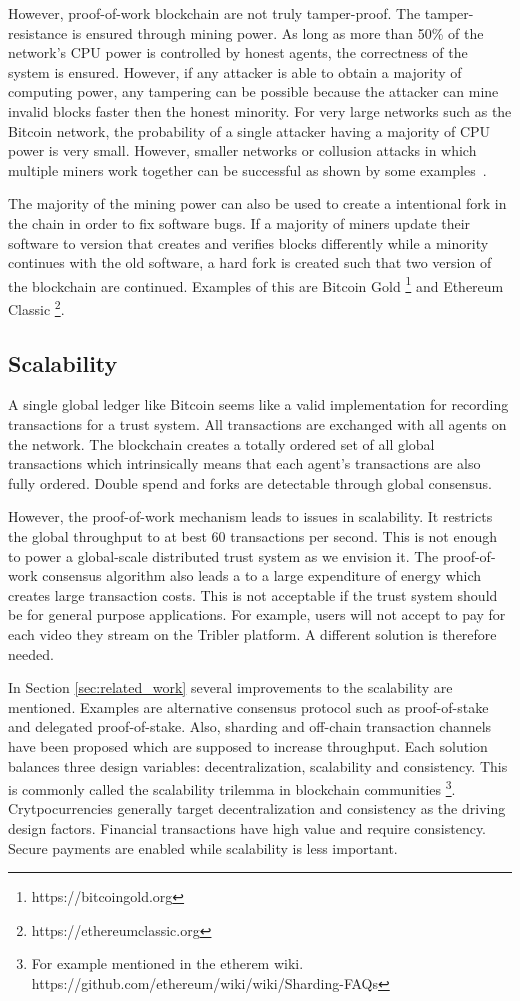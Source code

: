 However, proof-of-work blockchain are not truly tamper-proof. The tamper-resistance is ensured through
mining power. As long as more than 50\% of the network's CPU power is controlled by honest agents, 
the correctness of the system is ensured. However, if any attacker is able to obtain a majority of
computing power, any tampering can be possible because the attacker can mine invalid blocks faster
then the honest minority. For very large networks such as the Bitcoin network, the probability of 
a single attacker having a majority of CPU power is very small. However, smaller networks or collusion
attacks in which multiple miners work together can be successful as shown by some examples~\cite{51percentbitcoingold, 51percentverge}.

The majority of the mining power can also be used to create a intentional fork in the chain in order 
to fix software bugs. If a majority of miners update their software to version that creates and verifies blocks
differently while a minority continues with the old software, a hard fork is created such that two
version of the blockchain are continued. Examples of this are Bitcoin Gold \footnote{https://bitcoingold.org} and Ethereum Classic \footnote{https://ethereumclassic.org}.

\subsection{Scalability}
A single global ledger like Bitcoin seems like a valid implementation for recording transactions for a
trust system. All transactions are exchanged with all agents on the network. The blockchain 
creates a totally ordered set of all global transactions which intrinsically means that each agent's 
transactions are also fully ordered. Double spend and forks are detectable through global consensus. 

However, the proof-of-work mechanism leads to issues in scalability. It restricts the global throughput
to at best 60 transactions per second. This is not enough to power a global-scale distributed trust 
system as we envision it. The proof-of-work consensus algorithm also leads a to a large expenditure of energy which creates 
large transaction costs. This is not acceptable if the trust system should be for general purpose 
applications. For example, users will not accept to pay for each video they stream on the Tribler 
platform. A different solution is therefore needed.

In Section \ref{sec:related_work} several improvements to the scalability are mentioned. Examples are
alternative consensus protocol such as proof-of-stake and delegated proof-of-stake. Also, sharding
and off-chain transaction channels have been proposed which are supposed to increase throughput.
Each solution balances three design variables: decentralization, scalability and consistency. This
is commonly called the scalability trilemma in blockchain communities \footnote{For example mentioned in the etherem wiki. https://github.com/ethereum/wiki/wiki/Sharding-FAQs}.
Crytpocurrencies generally target decentralization and consistency as the driving design factors. 
Financial transactions have high value and require consistency. Secure payments are enabled while 
scalability is less important.


